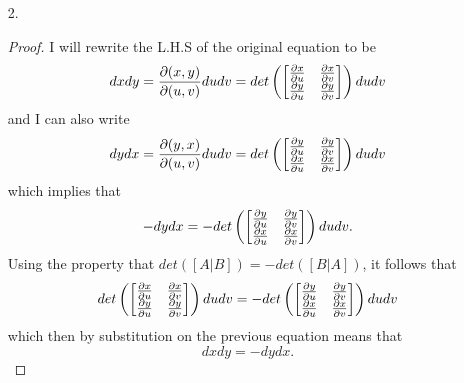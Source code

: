 \documentclass[titlepage]{article}
\begin{document}
\begin{solution}
\begin{itemize}
\begin{proof}
$$d(x+y)dz = \frac{\p (x + y,z)}{\p (u,v)}du\,dv =  dx\,dz + dy\,dz$$
Therefore, $d(x+y)dz = dxdz + dydz$.
\end{proof}
\item[2.]
\begin{proof} 
I will rewrite the L.H.S of the original equation to be
$$ dxdy = \frac{\p(x,y)}{\p(u,v)}dudv = det\left( \bmat{\frac{\p x}{\p u} & \frac{\p x}{\p v} \\ \frac{\p y}{\p u} & \frac{\p y}{\p v}}\right)dudv $$
and I can also write
$$ dydx =  \frac{\p(y,x)}{\p(u,v)}dudv =det\left( \bmat{\frac{\p y}{\p u} & \frac{\p y}{\p v} \\ \frac{\p x}{\p u} & \frac{\p x}{\p v}}\right)dudv $$
which implies that 
$$-dydx = - det\left( \bmat{\frac{\p y}{\p u} & \frac{\p y}{\p v} \\ \frac{\p x}{\p u} & \frac{\p x}{\p v}}\right)dudv.$$
Using the property that $det([A|B]) = -det([B|A])$, it follows that
$$ det\left( \bmat{\frac{\p x}{\p u} & \frac{\p x}{\p v} \\ \frac{\p y}{\p u} & \frac{\p y}{\p v}}\right)dudv = - det\left( \bmat{\frac{\p y}{\p u} & \frac{\p y}{\p v} \\ \frac{\p x}{\p u} & \frac{\p x}{\p v}}\right)dudv $$
which then by substitution on the previous equation means that
$$dxdy = -dydx.$$
\end{proof}
\end{itemize}
\end{solution}
\end{document}
